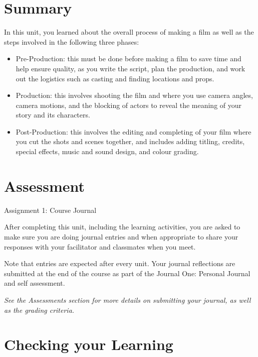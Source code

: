 \documentclass[
]{book}
\providecommand{\tightlist}{%
  \setlength{\itemsep}{0pt}\setlength{\parskip}{0pt}}
\begin{document}
\hypertarget{summary-1}{%
\section*{Summary}\label{summary-1}}

In this unit, you learned about the overall process of making a film as well as the steps involved in the following three phases:

\begin{itemize}
\tightlist
\item
  Pre-Production: this must be done before making a film to save time and help ensure quality, as you write the script, plan the production, and work out the logistics such as casting and finding locations and props.
\item
  Production: this involves shooting the film and where you use camera angles, camera motions, and the blocking of actors to reveal the meaning of your story and its characters.
\item
  Post-Production: this involves the editing and completing of your film where you cut the shots and scenes together, and includes adding titling, credits, special effects, music and sound design, and colour grading.
\end{itemize}

\hypertarget{assessment-3}{%
\section*{Assessment}\label{assessment-3}}

\begin{assessment}
{Assignment 1: Course Journal}

After completing this unit, including the learning activities, you are asked to make sure you are doing journal entries and when appropriate to share your responses with your facilitator and classmates when you meet.

Note that entries are expected after every unit. Your journal reflections are submitted at the end of the course as part of the Journal One: Personal Journal and self assessment.

\emph{See the Assessments section for more details on submitting your journal, as well as the grading criteria.}
\end{assessment}

\hypertarget{checking-your-learning-1}{%
\section*{Checking your Learning}\label{checking-your-learning-1}}
\end{document}

